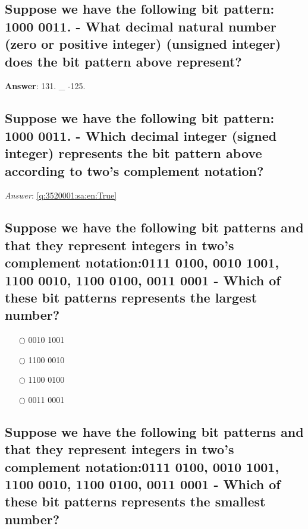 \documentclass[a4paper,11pt,oneside]{article}
\begin{document}
\begin{sloppypar}
\subsection{Suppose we have the following bit pattern: 1000 0011. - What decimal natural number (zero or positive integer) (unsigned integer) does the bit pattern above represent?}

\label{q:35200:sa:en:True}

\textbf{Answer}: 131. _ -125.

\subsection{Suppose we have the following bit pattern: 1000 0011. - Which decimal integer (signed integer) represents the bit pattern above according to two's complement notation?}

\label{q:3520001:sa:en:True}

\vspace{2cm}

\noindent\makebox[\textwidth]{\hrulefill}

\vspace{1cm}

\textit{Answer}: \autoref{q:3520001:sa:en:True}



\subsection{Suppose we have the following bit patterns and that they represent integers in two's complement notation:0111 0100, 0010 1001, 1100 0010, 1100 0100, 0011 0001 - Which of these bit patterns represents the largest number?}

\label{q:35300:mc:en:True}

\begin{itemize}
  \item[$\bigcirc$] 0010 1001
  \item[$\bigcirc$] 1100 0010
  \item[$\bigcirc$] 1100 0100
  \item[$\bigcirc$] 0011 0001
\end{itemize}

\subsection{Suppose we have the following bit patterns and that they represent integers in two's complement notation:0111 0100, 0010 1001, 1100 0010, 1100 0100, 0011 0001 - Which of these bit patterns represents the smallest number?}


\end{sloppypar}
\end{document}
